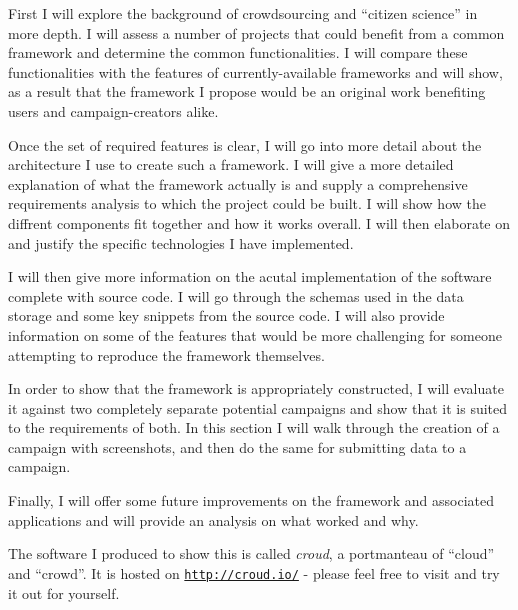 \documentclass{article}
\begin{document}
		First I will explore the background of crowdsourcing and ``citizen science'' in more depth. I will assess a number of projects that could benefit from a common framework and determine the common functionalities. I will compare these functionalities with the features of currently-available frameworks and will show, as a result that the framework I propose would be an original work benefiting users and campaign-creators alike.

		Once the set of required features is clear, I will go into more detail about the architecture I use to create such a framework. I will give a more detailed explanation of what the framework actually is and supply a comprehensive requirements analysis to which the project could be built. I will show how the diffrent components fit together and how it works overall. I will then elaborate on and justify the specific technologies I have implemented.

		I will then give more information on the acutal implementation of the software complete with source code. I will go through the schemas used in the data storage and some key snippets from the source code. I will also provide information on some of the features that would be more challenging for someone attempting to reproduce the framework themselves.

		In order to show that the framework is appropriately constructed, I will evaluate it against two completely separate potential campaigns and show that it is suited to the requirements of both. In this section I will walk through the creation of a campaign with screenshots, and then do the same for submitting data to a campaign.

		Finally, I will offer some future improvements on the framework and associated applications and will provide an analysis on what worked and why.

		The software I produced to show this is called \textit{croud}, a portmanteau of ``cloud'' and ``crowd''. It is hosted on \href{http://croud.io/}{\texttt{http://croud.io/}} - please feel free to visit and try it out for yourself.
\end{document}
